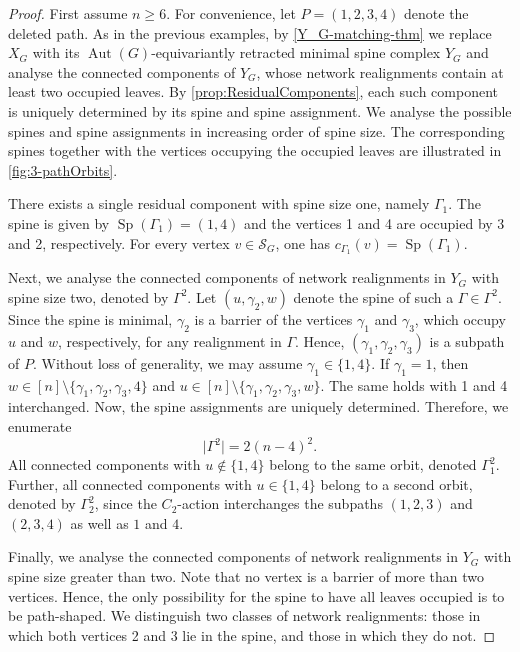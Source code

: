 \documentclass[reqno,dvipsnames]{amsart}
\theoremstyle{plain}
\numberwithin{equation}{section}
\theoremstyle{definition}
\DeclareMathOperator{\Sp}{Sp}
\DeclareMathOperator{\Aut}{Aut}
\begin{document}
\begin{proof}
	First assume $n\geq 6.$ For convenience, let $P=(1,2,3,4)$ denote the deleted path. As in the previous examples, by \autoref{Y_G-matching-thm} we replace $X_G$ with its $\Aut(G)$-equivariantly retracted minimal spine complex $Y_G$ and analyse the connected components of $Y_G$, whose network realignments contain at least two occupied leaves. By \autoref{prop:ResidualComponents}, each such component is uniquely determined by its spine and spine assignment. We analyse the possible spines and spine assignments in increasing order of spine size. The corresponding spines together with the vertices occupying the occupied leaves are illustrated in \autoref{fig:3-pathOrbits}.
	
	There exists a single residual component with spine size one, namely $\Gamma_1$. The spine is given by $\Sp(\Gamma_1)=(1,4)$ and the vertices 1 and 4 are occupied by 3 and 2, respectively. For every vertex $v\in \mathcal{S}_G$, one has $c_{\Gamma_1}(v)=\Sp(\Gamma_1)$.
	
	Next, we analyse the connected components of network realignments in $Y_G$ with spine size two, denoted by $\Gamma^2$. Let $(u,\gamma_2, w)$ denote the spine of such a $\Gamma\in\Gamma^2$. Since the spine is minimal, $\gamma_2$ is a barrier of the vertices $\gamma_1$ and $\gamma_3$, which occupy $u$ and $w$, respectively, for any realignment in $\Gamma$. Hence, $(\gamma_1, \gamma_2, \gamma_3)$ is a subpath of $P$. Without loss of generality, we may assume $\gamma_1 \in \{1,4\}$. If $\gamma_1 = 1$, then $w\in [n]\setminus \{\gamma_1,\gamma_2,\gamma_3, 4\}$ and $u\in [n]\setminus \{\gamma_1,\gamma_2,\gamma_3, w\}$. The same holds with 1 and 4 interchanged. Now, the spine assignments are uniquely determined. Therefore, we enumerate
	\begin{equation*}
		\vert\Gamma^2\vert = 2(n-4)^2.
	\end{equation*}
	All connected components with $u \notin \{1,4\}$ belong to the same orbit, denoted $\Gamma^2_1$. Further, all connected components with $u \in \{1,4\}$ belong to a second orbit, denoted by $\Gamma^2_2$, since the $C_2$-action interchanges the subpaths $(1,2,3)$ and $(2,3,4)$ as well as $1$ and $4$.
	
	Finally, we analyse the connected components of network realignments in $Y_G$ with spine size greater than two. Note that no vertex is a barrier of more than two vertices. Hence, the only possibility for the spine to have all leaves occupied is to be path-shaped. We distinguish two classes of network realignments: those in which both vertices 2 and 3 lie in the spine, and those in which they do not.
	

\end{proof}
\end{document}
